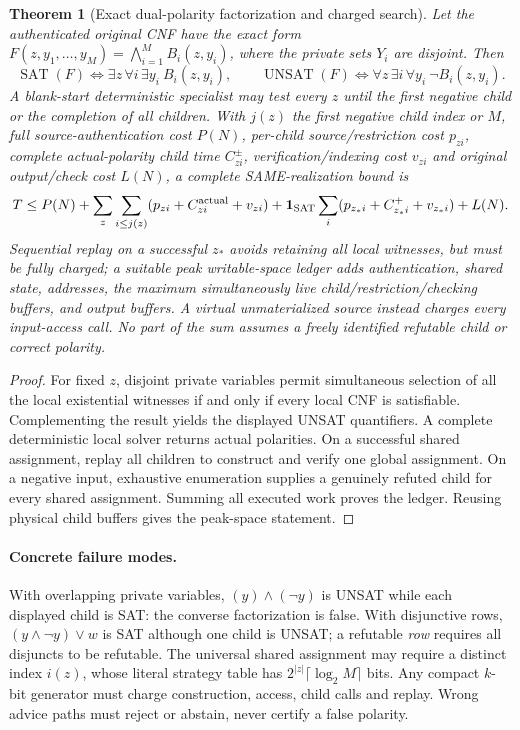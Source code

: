 \documentclass[11pt]{article}
\newtheorem{theorem}{Theorem}
\begin{document}
\begin{theorem}[Exact dual-polarity factorization and charged search]
Let the authenticated original CNF have the exact form
$F(z,y_1,\ldots,y_M)=\bigwedge_{i=1}^{M}B_i(z,y_i)$,
where the private sets $Y_i$ are disjoint. Then
\[
 \operatorname{SAT}(F)\Longleftrightarrow
 \exists z\,\forall i\,\exists y_i\ B_i(z,y_i),\qquad
 \operatorname{UNSAT}(F)\Longleftrightarrow
 \forall z\,\exists i\,\forall y_i\ \neg B_i(z,y_i).
\]
A blank-start deterministic specialist may test every $z$ until the first
negative child or the completion of all children. With $j(z)$ the
first negative child index or $M$, full source-authentication cost $P(N)$,
per-child source/restriction cost $p_{zi}$, complete actual-polarity child
time $C_{zi}^{\pm}$, verification/indexing cost $v_{zi}$ and original
output/check cost $L(N)$, a complete SAME-realization bound is
\[
 T\le P(N)+\sum_{z}\sum_{i\le j(z)}
 (p_{zi}+C_{zi}^{\mathrm{actual}}+v_{zi})
 +{\bf 1}_{\mathrm{SAT}}\sum_i
 (p_{z_*i}+C_{z_*i}^{+}+v_{z_*i})+L(N).
\]
Sequential replay on a successful $z_*$ avoids retaining all local
witnesses, but must be fully charged; a suitable peak writable-space
ledger adds authentication, shared state, addresses, the maximum
\emph{simultaneously live} child/restriction/checking buffers, and
output buffers. A virtual unmaterialized source instead charges every
input-access call. No part of the sum assumes a freely identified
refutable child or correct polarity.
\end{theorem}
\begin{proof}
For fixed $z$, disjoint private variables permit simultaneous selection
of all the local existential witnesses if and only if every local CNF
is satisfiable. Complementing the result yields the displayed
UNSAT quantifiers. A complete deterministic local solver returns actual
polarities. On a successful shared assignment, replay all children to
construct and verify one global assignment. On a negative input, exhaustive
enumeration supplies a genuinely refuted child for every shared assignment.
Summing all executed work proves the ledger. Reusing physical child buffers
gives the peak-space statement.
\end{proof}

\paragraph{Concrete failure modes.}
With overlapping private variables, $(y)\wedge(\neg y)$ is UNSAT while
each displayed child is SAT: the converse factorization is false.
With disjunctive rows, $(y\wedge\neg y)\vee w$ is SAT although one
child is UNSAT; a refutable \emph{row} requires all disjuncts to be
refutable. The universal shared assignment may require a distinct index
$i(z)$, whose literal strategy table has $2^{|z|}\lceil\log_2 M\rceil$
bits. Any compact $k$-bit generator must charge construction, access,
child calls and replay. Wrong advice paths must reject or abstain,
never certify a false polarity.
\end{document}
